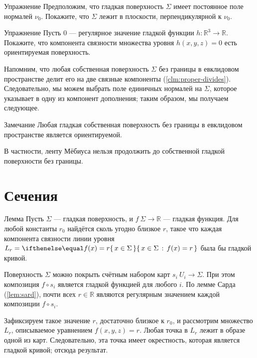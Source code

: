 {\sloppy

\begin{thm}{Упражнение}\label{ex:const-normal}
Предположим, что гладкая поверхность $\Sigma$ имеет постоянное поле нормалей $\nu_0$.
Покажите, что $\Sigma$ лежит в плоскости, перпендикулярной к $\nu_0$.
\end{thm}

}

\begin{thm}{Упражнение}\label{ex:implicit-orientable}
Пусть $0$ --- регулярное значение гладкой функции
$h:\mathbb{R}^3\to\mathbb{R}$.
Покажите, что компонента связности множества уровня $h(x,y,z)=0$ есть ориентируемая поверхность.
\end{thm}

Напомним, что любая собственная поверхность $\Sigma$ без границы в евклидовом пространстве делит его на две связные компоненты (\ref{clm:proper-divides}).
Следовательно, мы можем выбрать поле единичных нормалей на $\Sigma$, которое указывает в одну из компонент дополнения; таким образом, мы получаем следующее.

\begin{thm}{Замечание}
Любая гладкая собственная поверхность без границы в евклидовом пространстве является ориентируемой.
\end{thm}

В частности, ленту Мёбиуса нельзя продолжить до собственной гладкой поверхности без границы.

\section{Сечения}

\begin{thm}{Лемма}\label{lem:reg-section}
Пусть $\Sigma$ --- гладкая поверхность, и $f\:\Sigma\to\mathbb{R}$ --- гладкая функция.
Для любой константы $r_0$ найдётся сколь угодно близкое $r$, такое что 
каждая компонента связности линии уровня $L_r=\set{x\in\Sigma}{f(x)=r}$ была бы гладкой кривой.
\end{thm}

Поверхность $\Sigma$ можно покрыть счётным набором карт $s_i\:U_i\to \Sigma$.
При этом композиция $f\circ s_i$ является гладкой функцией для любого $i$.
По лемме Сарда (\ref{lem:sard}), почти всех $r\in \mathbb{R}$ являются регулярным значением каждой композиции $f\circ s_i$.

Зафиксируем такое значение $r$, достаточно близкое к $r_0$, и рассмотрим множество $L_r$, описываемое уравнением $f(x,y,z)=r$.
Любая точка в $L_r$ лежит в образе одной из карт.
Следовательно, эта точка имеет окрестность, которая является гладкой кривой;
отсюда результат.
\qeds

